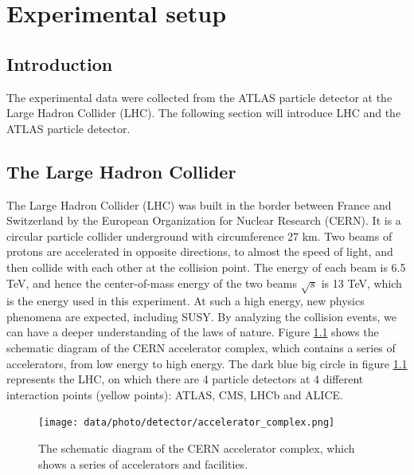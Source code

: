 \chapter{Experimental setup}
\label{ch:detector}

\section{Introduction}
\label{sec:detector_introduction}

The experimental data were collected from the ATLAS particle detector at the Large Hadron Collider (LHC).
The following section will introduce LHC and the ATLAS particle detector.

\section{The Large Hadron Collider}
\label{sec:detector_LHC}

The Large Hadron Collider (LHC) was built in the border between France and Switzerland by the European Organization for Nuclear Research (CERN).
It is a circular particle collider underground with circumference 27 km.
Two beams of protons are accelerated in opposite directions, to almost the speed of light, and then collide with each other at the collision point.
The energy of each beam is 6.5 TeV, and hence the center-of-mass energy of the two beams $\sqrt{s}$ is 13 TeV, which is the energy used in this experiment.
At such a high energy, new physics phenomena are expected, including SUSY.
By analyzing the collision events, we can have a deeper understanding of the laws of nature.
Figure \ref{fig:detector_LHC_accelerator_complex} shows the schematic diagram of the CERN accelerator complex, which contains a series of accelerators, from low energy to high energy.
The dark blue big circle in figure \ref{fig:detector_LHC_accelerator_complex} represents the LHC, on which there are 4 particle detectors at 4 different interaction points (yellow points): ATLAS, CMS, LHCb and ALICE.

\begin{figure}
\centering
\texttt{[image: data/photo/detector/accelerator\_complex.png]}
\caption{The schematic diagram of the CERN accelerator complex, which shows a series of accelerators and facilities. \cite{complex}}
\label{fig:detector_LHC_accelerator_complex}
\end{figure}

